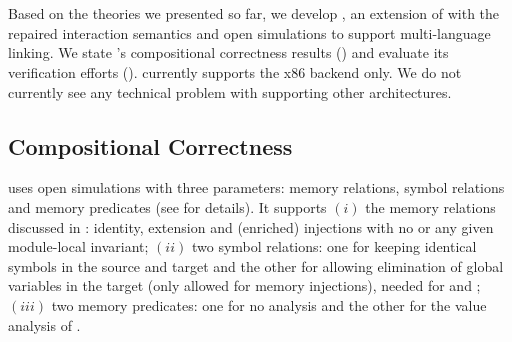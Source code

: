 \chapter{\;\;\;\;\ccm{}}\label{sec:results}


Based on the theories we presented so far, we develop \ccm{}, an extension of \cc{} with the
repaired interaction semantics and open simulations to support multi-language linking.  We state
\ccm{}'s compositional correctness results () and evaluate its
verification efforts ().  \ccm{} currently supports the x86 backend only.
We do not currently see any technical problem with supporting other architectures.



\section{Compositional Correctness}
\label{sec:results:compiler}

\ccm{} uses open simulations with three parameters:
memory relations, symbol relations and memory predicates
(see  for details).
It supports $(i)$ the memory relations discussed in :
identity, extension and (enriched) injections with no or any given module-local invariant;
$(ii)$ two symbol relations: one for keeping identical symbols in the source and target
and the other for allowing elimination of global variables in the target (only allowed for memory injections), needed for  and ;
$(iii)$ two memory predicates: one for no analysis and the other for the value analysis of \cc{}.

